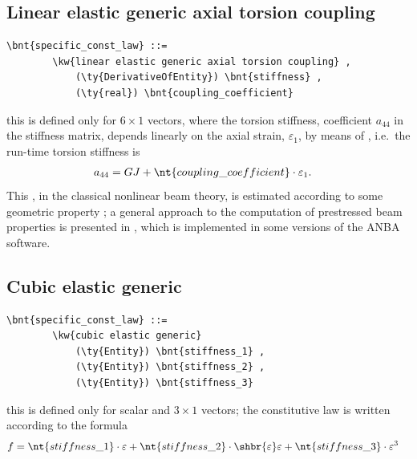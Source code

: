 \subsection{Linear elastic generic axial torsion coupling}
\label{sec:ConstitutiveLaw:LINEAR-ELASTIC-GENERIC-AXIAL-TORSION-COUPLING}
\begin{Verbatim}[commandchars=\\\{\}]
    \bnt{specific_const_law} ::= 
        \kw{linear elastic generic axial torsion coupling} ,
            (\ty{DerivativeOfEntity}) \bnt{stiffness} ,
            (\ty{real}) \bnt{coupling_coefficient}
\end{Verbatim}
this is defined only for $6 \times 1$ vectors, where the torsion stiffness,
coefficient $ a_{44} $ in the stiffness matrix, depends linearly on 
the axial strain, $ \varepsilon_1 $, by means of 
, i.e.\ the run-time torsion stiffness is 
\begin{align}
	a_{44}
	&=
	GJ + \nt{coupling\_coefficient} \cdot \varepsilon_1 .
\end{align}
This , in the classical nonlinear beam theory,
is estimated according to some geometric property \cite{HOUBOLT-BROOKS-1957};
a general approach to the computation of prestressed beam properties
is presented in \cite{BORRI-MERLINI}, which is implemented in some versions
of the ANBA software.

\subsection{Cubic elastic generic}
\begin{Verbatim}[commandchars=\\\{\}]
    \bnt{specific_const_law} ::= 
        \kw{cubic elastic generic}
            (\ty{Entity}) \bnt{stiffness_1} ,
            (\ty{Entity}) \bnt{stiffness_2} ,
            (\ty{Entity}) \bnt{stiffness_3}
\end{Verbatim}
this is defined only for scalar and $3 \times 1$ vectors; the constitutive
law is written according to the formula
\begin{align}
	f
	&=
	\nt{stiffness\_1} \cdot \varepsilon
	+ \nt{stiffness\_2} \cdot \shbr{\varepsilon}\varepsilon
	+ \nt{stiffness\_3} \cdot \varepsilon^3
\end{align}
%

